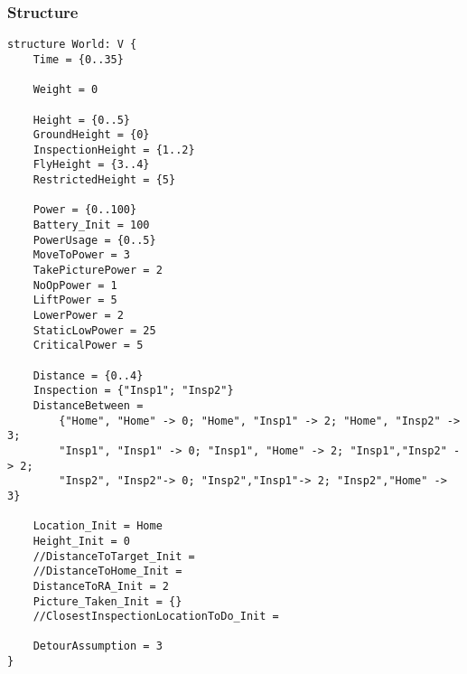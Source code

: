 \documentclass[12pt]{extarticle}
\begin{document}
\subsubsection*{Structure}
\begin{lstlisting}[basicstyle=\tiny]
structure World: V {
    Time = {0..35}
    
    Weight = 0

    Height = {0..5}
    GroundHeight = {0}
    InspectionHeight = {1..2}
    FlyHeight = {3..4}
    RestrictedHeight = {5}
    
    Power = {0..100}
    Battery_Init = 100
    PowerUsage = {0..5}
    MoveToPower = 3
    TakePicturePower = 2
    NoOpPower = 1
    LiftPower = 5
    LowerPower = 2
    StaticLowPower = 25
    CriticalPower = 5
    
    Distance = {0..4}
    Inspection = {"Insp1"; "Insp2"}
    DistanceBetween =
    	{"Home", "Home" -> 0; "Home", "Insp1" -> 2; "Home", "Insp2" -> 3;
        "Insp1", "Insp1" -> 0; "Insp1", "Home" -> 2; "Insp1","Insp2" -> 2;
    	"Insp2", "Insp2"-> 0; "Insp2","Insp1"-> 2; "Insp2","Home" -> 3}
    
    Location_Init = Home
    Height_Init = 0
    //DistanceToTarget_Init =
    //DistanceToHome_Init =
    DistanceToRA_Init = 2
    Picture_Taken_Init = {}
    //ClosestInspectionLocationToDo_Init =
    
    DetourAssumption = 3
}
\end{lstlisting}
\end{document}
